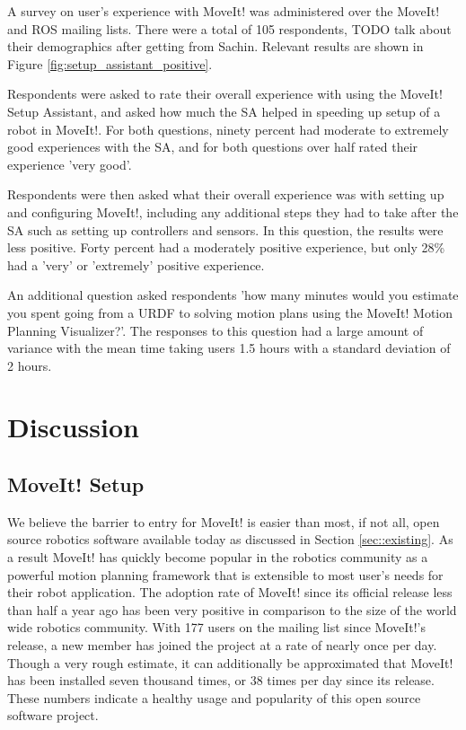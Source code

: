 \documentclass[10pt,journal,compsoc]{joser1}
\begin{document}
{A survey on user's experience with MoveIt! was administered over the MoveIt! and ROS mailing lists. There were a total of 105 respondents, TODO talk about their demographics after getting from Sachin. Relevant results are shown in Figure \ref{fig:setup_assistant_positive}. 

Respondents were asked to rate their overall experience with using the MoveIt! Setup Assistant, and asked how much the SA helped in speeding up setup of a robot in MoveIt!. For both questions, ninety percent had moderate to extremely good experiences with the SA, and for both questions over half rated their experience 'very good'. 

Respondents were then asked what their overall experience was with setting up and configuring MoveIt!, including any additional steps they had to take after the SA such as setting up controllers and sensors. In this question, the results were less positive. Forty percent had a moderately positive experience, but only 28\% had a 'very' or 'extremely' positive experience. 

An additional question asked respondents 'how many minutes would you estimate you spent going from a URDF to solving motion plans using the MoveIt! Motion Planning Visualizer?'. The responses to this question had a large amount of variance with the mean time taking users 1.5 hours with a standard deviation of 2 hours.



\section{Discussion}
\label{sec::discussion}

\subsection{MoveIt! Setup}
\label{sec::moveit_discussion}

We believe the barrier to entry for MoveIt! is easier than most, if not all, open source robotics software available today as discussed in Section \ref{sec::existing}. As a result MoveIt! has quickly become popular in the robotics community as a powerful motion planning framework that is extensible to most user's needs for their robot application. The adoption rate of MoveIt! since its official release less than half a year ago has been very positive in comparison to the size of the world wide robotics community. With 177 users on the mailing list since MoveIt!'s release, a new member has joined the project at a rate of nearly once per day. Though a very rough estimate, it can additionally be approximated that MoveIt! has been installed seven thousand times, or 38 times per day since its release. These numbers indicate a healthy usage and popularity of this open source software project.

}
\end{document}
